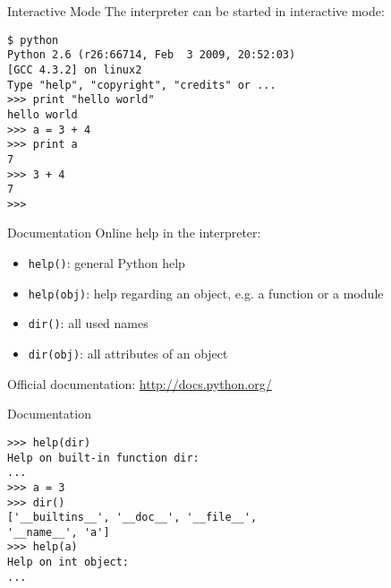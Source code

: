 \begin{frame}[fragile]{Interactive Mode}
The interpreter can be started in interactive mode:
\begin{lstlisting}[style=Shell]
$ python
Python 2.6 (r26:66714, Feb  3 2009, 20:52:03) 
[GCC 4.3.2] on linux2
Type "help", "copyright", "credits" or ...
>>> print "hello world"
hello world
>>> a = 3 + 4
>>> print a
7
>>> 3 + 4
7
>>>
\end{lstlisting} %
\end{frame}

\begin{frame}{Documentation}
Online help in the interpreter:
\begin{itemize}
\item \alert{\lstinline{help()}}: general Python help
\item \alert{\lstinline{help(obj)}}: help regarding an object, e.g. a function or a module
\item \alert{\lstinline{dir()}}: all used names
\item \alert{\lstinline{dir(obj)}}: all attributes of an object
\end{itemize}
\vspace{5mm}
Official documentation: \href{http://docs.python.org/}{http://docs.python.org/}
\end{frame}

\begin{frame}[fragile]{Documentation}
\begin{lstlisting}[style=Shell]
>>> help(dir)
Help on built-in function dir:
...
>>> a = 3
>>> dir()
['__builtins__', '__doc__', '__file__', 
'__name__', 'a']
>>> help(a)
Help on int object:
...
\end{lstlisting}
\end{frame}

